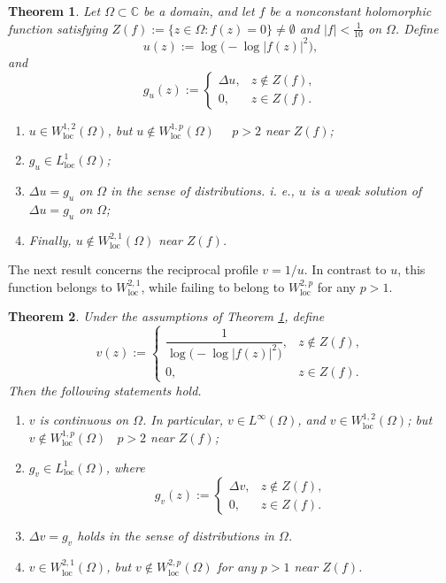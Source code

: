 \documentclass[12pt,twoside]{amsart}
\numberwithin{equation}{section}
\newtheorem{theorem}{Theorem}[section]
\numberwithin{definition}{section} %
\begin{document}
\begin{theorem}\label{th:maintheorem1}
Let $\Omega\subset\mathbb C$ be a domain, and let $f$ be a nonconstant holomorphic function satisfying
$
Z(f):=\{z\in\Omega:f(z)=0\}\neq\emptyset
$
and
$
|f|<\frac1{10}
$
on $\Omega$.
Define
\[
u(z):=\log\bigl(-\log|f(z)|^2\bigr),
\]
and
\begin{equation}
g_u(z):=
\begin{cases}
\Delta u, & z\notin Z(f),\\
0, & z\in Z(f).
\end{cases}
\end{equation}
\begin{enumerate}
\item $ u\in W_{\mathrm{loc}}^{1,2}(\Omega)$, but $u \notin  W_{\mathrm{loc}}^{1,p}(\Omega) $\  \ $p>2$ near $Z(f)$;
\item  $g_u \in  L_{\mathrm{loc}}^1(\Omega)$;
\item $\Delta u= g_u$ on $\Omega$  in the sense of distributions.  i. e., $u$ is a weak solution of $\Delta u= g_u$ on $\Omega$;
 \item Finally,  $u \notin  W_{\mathrm{loc}}^{2,1}(\Omega) $ near $Z(f)$.
\end{enumerate}
\end{theorem}

The next result concerns the reciprocal profile \(v=1/u\). In contrast to \(u\), this function belongs to \(W_{\mathrm{loc}}^{2,1}\), while failing to belong to \(W_{\mathrm{loc}}^{2,p}\) for any \(p>1\).

\begin{theorem}\label{th:maintheorem2}
Under the assumptions of Theorem \ref{th:maintheorem1}, define
\begin{equation}
v(z):=
\begin{cases}
\dfrac{1}{\log\bigl(-\log|f(z)|^2\bigr)}, & z\notin Z(f),\\[6pt]
0, & z\in Z(f).
\end{cases}
\end{equation}
 Then the following statements hold.
 \begin{enumerate}
\item $v$ is continuous on $\Omega$.  In particular, $v \in L^\infty (\Omega)$, and $v \in W_\mathrm{loc}^{1,2}(\Omega) $; but  $v \notin W_\mathrm{loc}^{1,p}(\Omega) $   \ $p>2$   near $Z(f)$;
\item  $g_v \in L^1_{\mathrm{loc}}(\Omega)$,  where
\begin{equation}
g_v(z):=
\begin{cases}
\Delta v, & z\notin Z(f),\\
0, & z\in Z(f).
\end{cases}
\end{equation}
  \item $\Delta v= g_v$ holds in the sense of distributions in $\Omega$.
 \item  $v\in W_\mathrm{loc}^{2,1}(\Omega) $,  but $v\notin W_\mathrm{loc}^{2,p}(\Omega) $ for any $p>1$ near $Z(f)$.
\end{enumerate}
 \end{theorem}
\end{document}
